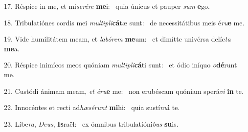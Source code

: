 17. Réspice in me, et mi\textit{se}\textit{ré}\textit{re} \textbf{me}i: \ast\  quia únicus et pauper \textit{sum} \textbf{e}go.\

18. Tribulatiónes cordis mei \textit{mul}\textit{ti}\textit{pli}\textbf{cá}tæ sunt: \ast\  de necessitátibus meis é\textit{ru}\textbf{e} me.\

19. Vide humilitátem meam, et \textit{la}\textit{bó}\textit{rem} \textbf{me}um: \ast\  et dimítte univérsa delíc\textit{ta} \textbf{me}a.\

20. Réspice inimícos meos quóniam \textit{mul}\textit{ti}\textit{pli}\textbf{cá}ti sunt: \ast\  et ódio iníquo \textit{o}\textbf{dé}runt me.\

21. Custódi ánimam meam, \textit{et} \textit{é}\textit{ru}\textbf{e} me: \ast\  non erubéscam quóniam sperá\textit{vi} \textbf{in} te.\

22. Innocéntes et recti ad\textit{hæ}\textit{sé}\textit{runt} \textbf{mi}hi: \ast\  quia sustí\textit{nu}\textbf{i} te.\

23. Líbe\textit{ra}, \textit{De}\textit{us}, \textbf{Is}raël: \ast\  ex ómnibus tribulatióni\textit{bus} \textbf{su}is.\

